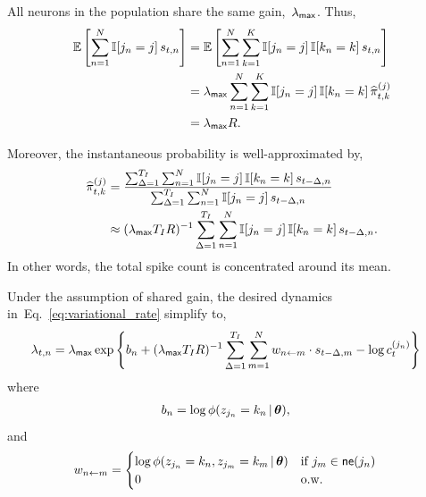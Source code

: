 \begin{assumption}
  All neurons in the population share the same gain,~$\lambda_{\mathsf{max}}$.
  Thus,
  \begin{align}
    \mathbb{E} \left[ \sum_{n=1}^N \mathbb{I}[j_n=j] \, s_{t,n} \right]
    &= \mathbb{E} \left[ \sum_{n=1}^N \sum_{k=1}^K \mathbb{I}[j_n=j] \, \mathbb{I}[k_n=k] \,s_{t,n} \right] \\
    &= \lambda_{\mathsf{max}} \sum_{n=1}^N \sum_{k=1}^K \mathbb{I}[j_n=j] \, \mathbb{I}[k_n=k] \, \widehat{\pi}_{t,k}^{(j)} \\
    &= \lambda_{\mathsf{max}} R.
  \end{align}

  Moreover, the instantaneous probability is well-approximated by,
  \begin{align}
      \widehat{\pi}_{t,k}^{(j)} &=
  \frac{\sum_{\Delta=1}^{T_I} \sum_{n=1}^N \mathbb{I}[j_n=j] \, \mathbb{I}[k_n=k] \, s_{t-\Delta ,n}}
       {\sum_{\Delta=1}^{T_I} \sum_{n=1}^N \mathbb{I}[j_n=j] \, s_{t-\Delta ,n}} \\
       &\approx (\lambda_{\mathsf{max}} T_I R)^{-1} \sum_{\Delta=1}^{T_I} \sum_{n=1}^N \mathbb{I}[j_n=j] \, \mathbb{I}[k_n=k] \, s_{t-\Delta,n}.
  \end{align}
  In other words, the total spike count is concentrated around its mean.
\end{assumption}

Under the assumption of shared gain, the
desired dynamics in~Eq.~\ref{eq:variational_rate}
simplify to,
\begin{align}
  \label{eq:mf_log_probs}
  \lambda_{t,n} &= \lambda_{\mathsf{max}}
  \exp \left \{b_n + (\lambda_{\mathsf{max}} T_I R)^{-1} \sum_{\Delta=1}^{T_I} \sum_{m=1}^N w_{n \leftarrow m} \cdot s_{t-\Delta,m}
  - \log c_t^{(j_n)} \right \}
\end{align}
where
\begin{align}
  b_n &= \log \phi(z_{j_n} = k_n \,|\, \boldsymbol{\theta}),
\end{align}
and
\begin{align}
  w_{n \leftarrow m} &=
  \begin{cases}
    \log \phi(z_{j_n}=k_n, z_{j_m}=k_m \,|\, \boldsymbol{\theta}) & \text{if }j_m
    \in \mathsf{ne}(j_n) \\
    0 & \text{o.w.}
  \end{cases}
\end{align}


